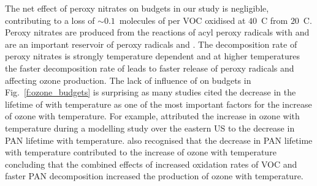 \vspace{-5mm}
The net effect of peroxy nitrates on  budgets in our study is negligible, contributing to a loss of $\sim0.1$~molecules of  per VOC oxidised at $40$~\degree C from $20$~\degree C.
Peroxy nitrates are produced from the reactions of acyl peroxy radicals with  and are an important reservoir of peroxy radicals and .
The decomposition rate of peroxy nitrates is strongly temperature dependent and at higher temperatures the faster decomposition rate of  leads to faster release of peroxy radicals and  affecting ozone production.
The lack of influence of  on  budgets in Fig.~\ref{f:ozone_budgets} is surprising as many studies cited the decrease in the lifetime of  with temperature as one of the most important factors for the increase of ozone with temperature.
For example, \citet{Dawson:2007} attributed the increase in ozone with temperature during a modelling study over the eastern US to the decrease in PAN lifetime with temperature.
\citet{Steiner:2006} also recognised that the decrease in PAN lifetime with temperature contributed to the increase of ozone with temperature concluding that the combined effects of increased oxidation rates of VOC and faster PAN decomposition increased the production of ozone with temperature.

